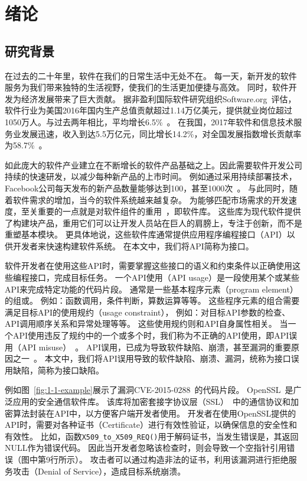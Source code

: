 \chapter{绪论}
\label{cha:intro}

\section{研究背景}
在过去的二十年里，软件在我们的日常生活中无处不在。
每一天，新开发的软件服务为我们带来独特的生活视野，使我们的生活更加便捷与高效。
同时，软件开发为经济发展带来了巨大贡献。
据非盈利国际软件研究组织Software.org~\cite{software-org}评估，软件行业为美国2016年国内生产总值贡献超过1.14万亿美元，提供就业岗位超过1050万人。与过去两年相比，平均增长6.5\%~\cite{2017-eco-report}。
在我国，2017年软件和信息技术服务业发展迅速，收入到达5.5万亿元，同比增长14.2\%，对全国发展指数增长贡献率为58.7\%~\cite{2018-china-report}。


如此庞大的软件产业建立在不断增长的软件产品基础之上。因此需要软件开发公司持续的快速研发，以减少每种新产品的上市时间。
例如通过采用持续部署技术，Facebook公司每天发布的新产品数量能够达到100，甚至1000次~\cite{16-icse-continuous}。
与此同时，随着软件需求的增加，当今的软件系统越来越复杂。
为能够匹配市场需求的开发速度，至关重要的一点就是对软件组件的重用~\cite{2011-icsr-reuse, 2013-cbse-reuse}，即软件库。
这些库为现代软件提供了构建块产品，重用它们可以让开发人员站在巨人的肩膀上，专注于创新，而不是重塑基本模块。
更具体地说，这些软件库通常提供应用程序编程接口（API）以供开发者来快速构建软件系统。
在本文中，我们将API简称为接口。


软件开发者在使用这些API时，需要掌握这些接口的语义和约束条件以正确使用这些编程接口，完成目标任务。
一个API使用（API usage）是一段使用某个或某些API来完成特定功能的代码片段。
通常是一些基本程序元素（program element）的组或。
例如：函数调用，条件判断，算数运算等等。
这些程序元素的组合需要满足目标API的使用规约（usage constraint），
例如：对目标API参数的检查、API调用顺序关系和异常处理等等。
这些使用规约则和API自身属性相关。
当一个API使用违反了规约中的一个或多个时，我们称为不正确的API使用，即API误用（API misuse）~\cite{16-msr-mubench}。
API误用，已成为导致软件缺陷、崩溃，甚至漏洞的重要原因之一~\cite{12-ccs-android,12-ccs-ssl,13-ccs-misuse,13-tse-missing-call,14-apsys-case,15-icpc-api,16-ase-spec}。
本文中，我们将API误用导致的软件缺陷、崩溃、漏洞，统称为接口误用缺陷，简称为接口缺陷。


例如图~\ref{fig:1-1-example}展示了漏洞CVE-2015-0288~\cite{CVE-2015-0288}的代码片段。
OpenSSL~\cite{openssl}是广泛应用的安全通信软件库。
该库将加密套接字协议层（SSL）~\cite{ssl}中的通信协议和加密算法封装在API中，以方便客户端开发者使用。
开发者在使用OpenSSL提供的API时，需要对各种证书（Certificate）进行有效性验证，以确保信息的安全性和有效性。
比如，函数\texttt{X509\_to\_X509\_REQ()}用于解码证书，当发生错误是，其返回NULL作为错误代码。
因此当开发者忽略该检查时，则会导致一个空指针引用错误（图中第9行所示）。
攻击者可以通过构造非法的证书，利用该漏洞进行拒绝服务攻击（Denial of Service），造成目标系统崩溃。



